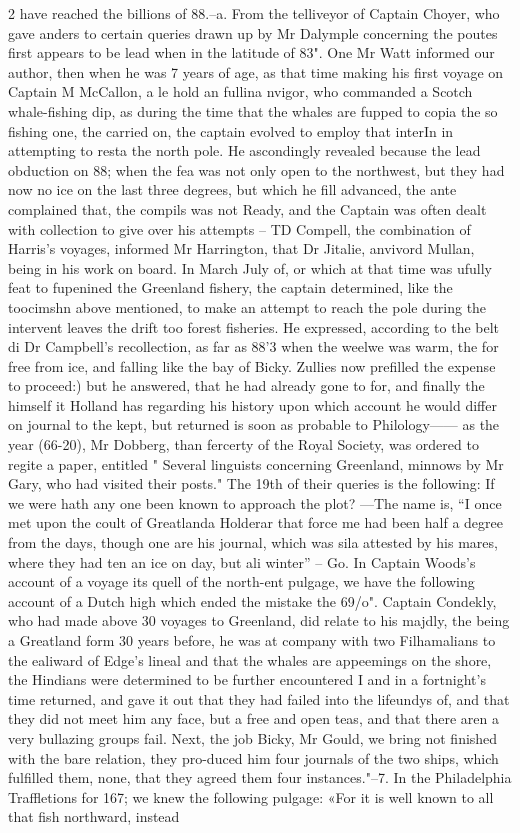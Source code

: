 \documentclass[10pt]{article}
\begin{document}
\begin{multicols}{2}
have reached the billions of 88.--a. From the telliveyor of Captain Choyer, who gave anders to certain queries drawn up by Mr Dalymple concerning the poutes first appears to be lead when in the latitude of 83". One Mr Watt informed our author, then when he was 7 years of age, as that time making his first voyage on Captain M McCallon, a le hold an fullina nvigor, who commanded a Scotch whale-fishing dip, as during the time that the whales are fupped to copia the so fishing one, the carried on, the captain evolved to employ that interIn in attempting to resta the north pole. He ascondingly revealed because the lead obduction on 88; when the fea was not only open to the northwest, but they had now no ice on the last three degrees, but which he fill advanced, the ante complained that, the compils was not Ready, and the Captain was often dealt with collection to give over his attempts – TD Compell, the combination of Harris’s voyages, informed Mr Harrington, that Dr Jitalie, anvivord Mullan, being in his work on board. In March July of, or which at that time was ufully feat to fupenined the Greenland fishery, the captain determined, like the toocimshn above mentioned, to make an attempt to reach the pole during the intervent leaves the drift too forest fisheries. He expressed, according to the belt di Dr Campbell's recollection, as far as 88'3 when the weelwe was warm, the for free from ice, and falling like the bay of Bicky. Zullies now prefilled the expense to proceed:) but he answered, that he had already gone to for, and finally the himself it Holland has regarding his history upon which account he would differ on journal to the kept, but returned is soon as probable to Philology—— as the year (66-20), Mr Dobberg, than fercerty of the Royal Society, was ordered to regite a paper, entitled " Several linguists concerning Greenland, minnows by Mr Gary, who had visited their posts." The 19th of their queries is the following: If we were hath any one been known to approach the plot? —The name is, “I once met upon the coult of Greatlanda Holderar that force me had been half a degree from the days, though one are his journal, which was sila attested by his mares, where they had ten an ice on day, but ali winter” – Go. In Captain Woods’s account of a voyage its quell of the north-ent pulgage, we have the following account of a Dutch high which ended the mistake the 69/o". Captain Condekly, who had made above 30 voyages to Greenland, did relate to his majdly, the being a Greatland form 30 years before, he was at company with two Filhamalians to the ealiward of Edge’s lineal and that the whales are appeemings on the shore, the Hindians were determined to be further encountered I and in a fortnight’s time returned, and gave it out that they had failed into the lifeundys of, and that they did not meet him any face, but a free and open teas, and that there aren a very bullazing groups fail. Next, the job Bicky, Mr Gould, we bring not finished with the bare relation, they pro-duced him four journals of the two ships, which fulfilled them, none, that they agreed them four instances."--7. In the Philadelphia Traffletions for 167; we knew the following pulgage: «For it is well known to all that fish northward, instead 
\end{multicols}
\end{document}
